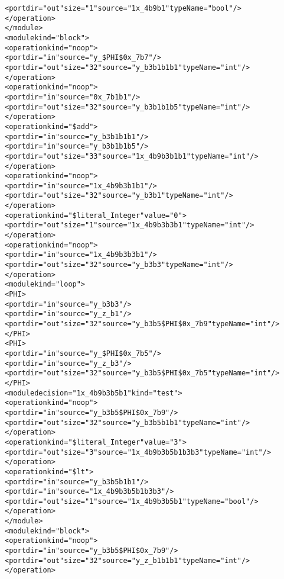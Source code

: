 \begin{alltt}
          <port dir="out" size="1" source="1x\_4b9b1" typeName="bool"/>
        </operation>
      </module>
      <module kind="block">
        <operation kind="noop">
          <port dir="in" source="y\_\$PHI\$0x\_7b7"/>
          <port dir="out" size="32" source="y\_b3b1b1b1" typeName="int"/>
        </operation>
        <operation kind="noop">
          <port dir="in" source="0x\_7b1b1"/>
          <port dir="out" size="32" source="y\_b3b1b1b5" typeName="int"/>
        </operation>
        <operation kind="\$add">
          <port dir="in" source="y\_b3b1b1b1"/>
          <port dir="in" source="y\_b3b1b1b5"/>
          <port dir="out" size="33" source="1x\_4b9b3b1b1" typeName="int"/>
        </operation>
        <operation kind="noop">
          <port dir="in" source="1x\_4b9b3b1b1"/>
          <port dir="out" size="32" source="y\_b3b1" typeName="int"/>
        </operation>
        <operation kind="\$literal\_Integer" value="0">
          <port dir="out" size="1" source="1x\_4b9b3b3b1" typeName="int"/>
        </operation>
        <operation kind="noop">
          <port dir="in" source="1x\_4b9b3b3b1"/>
          <port dir="out" size="32" source="y\_b3b3" typeName="int"/>
        </operation>
        <module kind="loop">
          <PHI>
            <port dir="in" source="y\_b3b3"/>
            <port dir="in" source="y\_z\_b1"/>
            <port dir="out" size="32" source="y\_b3b5\$PHI\$0x\_7b9" typeName="int"/>
          </PHI>
          <PHI>
            <port dir="in" source="y\_\$PHI\$0x\_7b5"/>
            <port dir="in" source="y\_z\_b3"/>
            <port dir="out" size="32" source="y\_b3b5\$PHI\$0x\_7b5" typeName="int"/>
          </PHI>
          <module decision="1x\_4b9b3b5b1" kind="test">
            <operation kind="noop">
              <port dir="in" source="y\_b3b5\$PHI\$0x\_7b9"/>
              <port dir="out" size="32" source="y\_b3b5b1b1" typeName="int"/>
            </operation>
            <operation kind="\$literal\_Integer" value="3">
              <port dir="out" size="3" source="1x\_4b9b3b5b1b3b3" typeName="int"/>
            </operation>
            <operation kind="\$lt">
              <port dir="in" source="y\_b3b5b1b1"/>
              <port dir="in" source="1x\_4b9b3b5b1b3b3"/>
              <port dir="out" size="1" source="1x\_4b9b3b5b1" typeName="bool"/>
            </operation>
          </module>
          <module kind="block">
            <operation kind="noop">
              <port dir="in" source="y\_b3b5\$PHI\$0x\_7b9"/>
              <port dir="out" size="32" source="y\_z\_b1b1b1" typeName="int"/>
            </operation>

\end{alltt}
